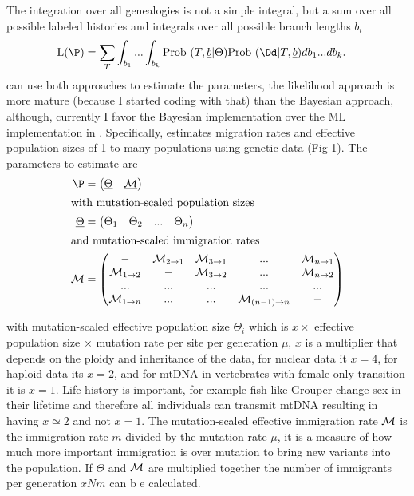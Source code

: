  The integration over all genealogies is not a simple integral, but a sum over all possible labeled histories and integrals over all possible branch lengths $b_i$
\begin{align}
{\rm L}(\P) &= \sum_T \int_{b_1} ... \int_{b_k} \prob(T,\underline{b} | \Theta) \prob(\Dd | T,\underline{b}) db_1...db_k.
\end{align}
\migrate can use both approaches to estimate the parameters, the likelihood approach is more mature (because I started coding with that) than the Bayesian approach, although, currently I favor the Bayesian implementation over the ML implementation in \migrate.
Specifically, \migrate estimates migration rates and effective population sizes of 1 to many populations
using genetic data (Fig 1).  The parameters to estimate are
\begin{align}
\label{PARAMETERS}
\P &= \left(\begin{matrix}  \underline{\Theta} & \underline{\M} \end{matrix}\right)  \\
\intertext{with mutation-scaled population sizes}
\underline{\Theta} &= \left( \begin{matrix} \Theta_1 & \Theta_2 & ... & \Theta_n \end{matrix} \right) \\
\intertext{and mutation-scaled immigration rates}
\underline{\M} &= \left( \begin{matrix} - & \M_{2 \rightarrow 1} & \M_{3 \rightarrow 1} & ... & \M_{n \rightarrow 1} \\  \M_{1 \rightarrow 2} & - & \M_{3 \rightarrow 2} & ... & \M_{n \rightarrow 2}\\ 
... & ... & ... & ... & ... \\
\M_{1 \rightarrow n}  & ... & ... & \M_{(n-1) \rightarrow n}  & - \end{matrix} \right)
\end{align}

with mutation-scaled effective population size $\Theta_i$ which is $x \times$ effective population size $\times$ mutation rate per site per generation $\mu$, $x$ is a multiplier that depends on the ploidy and inheritance of the data, for nuclear data it $x=4$, for haploid data its $x=2$, and for mtDNA in vertebrates with female-only transition it is $x=1$. Life history is important, for example fish like Grouper change sex in their lifetime and therefore all individuals can transmit mtDNA resulting in having $x\simeq2$ and not $x=1$. The mutation-scaled effective immigration rate $\mathcal{M}$ is the immigration rate $m$ divided by the mutation rate $\mu$, it is a measure of how much more important immigration is over mutation to bring new variants into the population. If $\Theta$ and $\mathcal{M}$ are multiplied together the number of immigrants per generation $xNm$ can b e calculated.


